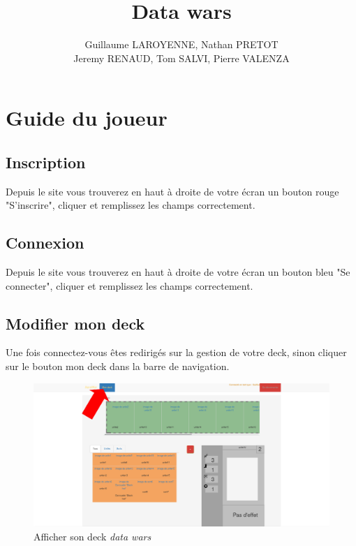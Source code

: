 \documentclass[a4paper,11pt]{report}
\title{Data wars }
\author{Guillaume LAROYENNE, Nathan PRETOT \\ Jeremy RENAUD, Tom SALVI, Pierre VALENZA}
\begin{document}
\maketitle
\tableofcontents

\chapter{Guide du joueur}

	\section{Inscription}
        Depuis le site vous trouverez en haut à droite de votre écran un bouton rouge "S'inscrire", cliquer et remplissez les champs correctement. 

	\section{Connexion}
        Depuis le site vous trouverez en haut à droite de votre écran un bouton bleu "Se connecter", cliquer et remplissez les champs correctement. 

	\section{Modifier mon deck}
       	Une fois connectez-vous êtes redirigés sur la gestion de votre deck, sinon cliquer sur le bouton mon deck dans la barre de navigation. 

	\begin{figure}[th]
		\begin{center}
		\includegraphics[scale=0.4]{Assets/go_deck.png}
      		\caption{Afficher son deck \textit{data wars}}
      		\label{fig1}
     		\end{center}
	\end{figure}
\end{document}
